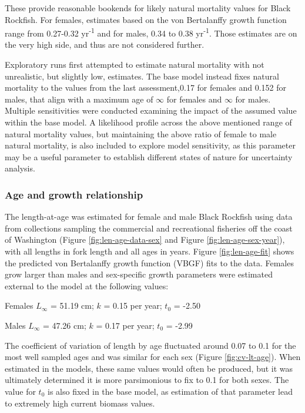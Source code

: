 \documentclass[11pt,
  english,
  letterpaper,
]{article}
\begin{document}
These provide reasonable bookends for likely natural mortality values for Black Rockfish. For females, estimates based on the von Bertalanffy growth function range from 0.27-0.32 yr\textsuperscript{-1} and for males, 0.34 to 0.38 yr\textsuperscript{-1}. Those estimates are on the very high side, and thus are not considered further.

Exploratory runs first attempted to estimate natural mortality with not unrealistic, but slightly low, estimates. The base model instead fixes natural mortality to the values from the last assessment,0.17 for females and 0.152 for males, that align with a maximum age of \ensuremath{\infty{}} for females and \ensuremath{\infty{}} for males. Multiple sensitivities were conducted examining the impact of the assumed value within the base model. A likelihood profile across the above mentioned range of natural mortality values, but maintaining the above ratio of female to male natural mortality, is also included to explore model sensitivity, as this parameter may be a useful parameter to establish different states of nature for uncertainty analysis.

\hypertarget{age-and-growth-relationship}{%
\subsubsection{Age and growth relationship}\label{age-and-growth-relationship}}

The length-at-age was estimated for female and male Black Rockfish using data from collections sampling the commercial and recreational fisheries off the coast of Washington (Figure \ref{fig:len-age-data-sex} and Figure \ref{fig:len-age-sex-year}), with all lengths in fork length and all ages in years. Figure \ref{fig:len-age-fit} shows the predicted von Bertalanffy growth function (VBGF) fits to the data. Females grow larger than males and sex-specific growth parameters were estimated external to the model at the following values:

\begin{centering}

Females $L_{\infty}$ = 51.19 cm; $k$ = 0.15 per year; $t_0$ = -2.50

Males $L_{\infty}$ = 47.26 cm; $k$ = 0.17 per year; $t_0$ = -2.99

\end{centering}

\vspace{0.5cm}

The coefficient of variation of length by age fluctuated around 0.07 to 0.1 for the most well sampled ages and was similar for each sex (Figure \ref{fig:cv-lt-age}). When estimated in the models, these same values would often be produced, but it was ultimately determined it is more parsimonious to fix to 0.1 for both sexes. The value for \(t_0\) is also fixed in the base model, as estimation of that parameter lead to extremely high current biomass values.
\end{document}

